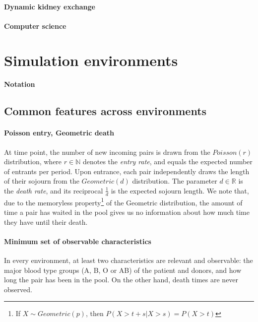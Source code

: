 \documentclass[format=acmsmall, review=false]{acmart}
\begin{document}
\paragraph{Dynamic kidney exchange}

\paragraph{Computer science}



\section{Simulation environments}

\paragraph{Notation} 

\subsection{Common features across environments}

\paragraph{Poisson entry, Geometric death} At time point, the number of new incoming pairs is drawn from the $Poisson(r)$ distribution, where $r \in \mathbb{N}$ denotes the \emph{entry rate}, and equals the expected number of entrants per period. Upon entrance, each pair independently draws the length of their sojourn from the $Geometric(d)$ distribution. The parameter $d \in \mathbb{R}$ is the \emph{death rate}, and its reciprocal $\frac{1}{d}$ is the expected sojourn length. We note that, due to the memoryless property\footnote{If $X \sim Geometric(p)$, then $P(X > t+s | X > s) = P(X > t)$} of the Geometric distribution, the amount of time a pair has waited in the pool gives us no information about how much time they have until their death.

\paragraph{Minimum set of observable characteristics} In every environment, at least two characteristics are relevant and observable: the major blood type groups (A, B, O or AB) of the patient and donors, and how long the pair has been in the pool. On the other hand, death times are never observed.
\end{document}
